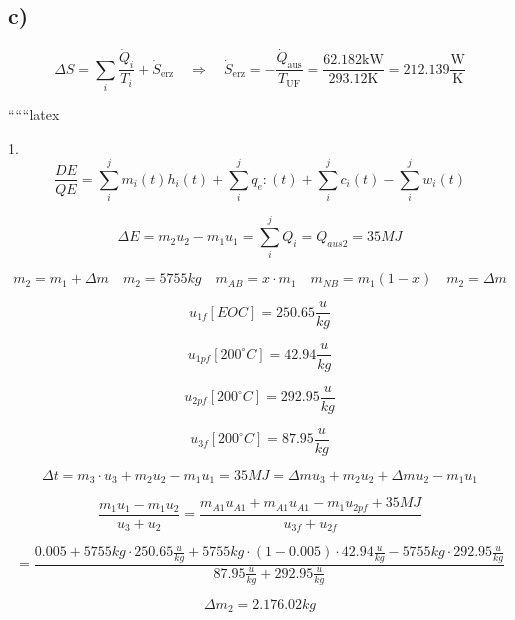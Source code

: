 

\subsection*{c)}

\begin{equation*}
\Delta S = \sum_{i} \frac{\dot{Q}_i}{T_i} + \dot{S}_{\text{erz}} \quad \Rightarrow \quad \dot{S}_{\text{erz}} = - \frac{\dot{Q}_{\text{aus}}}{T_{\text{UF}}} = \frac{62.182 \text{kW}}{293.12 \text{K}} = 212.139 \frac{\text{W}}{\text{K}}
\end{equation*}

``````latex

1. 
\[
\frac{DE}{QE} = \sum_i^j m_i(t) h_i(t) + \sum_i^j q_e:(t) + \sum_i^j c_i(t) - \sum_i^j w_i(t)
\]

\[
\Delta E = m_2 u_2 - m_1 u_1 = \sum_i^j Q_i = Q_{aus2} = 35MJ
\]

\[
m_2 = m_1 + \Delta m \quad m_2 = 5755kg \quad m_{AB} = x \cdot m_1 \quad m_{NB} = m_1 (1 - x) \quad m_2 = \Delta m
\]

\[
u_{1f} [EOC] = 250.65 \frac{u}{kg}
\]

\[
u_{1pf} [200^\circ C] = 42.94 \frac{u}{kg}
\]

\[
u_{2pf} [200^\circ C] = 292.95 \frac{u}{kg}
\]

\[
u_{3f} [200^\circ C] = 87.95 \frac{u}{kg}
\]

\[
\Delta t = m_3 \cdot u_3 + m_2 u_2 - m_1 u_1 = 35MJ = \Delta m u_3 + m_2 u_2 + \Delta m u_2 - m_1 u_1
\]

\[
\frac{m_1 u_1 - m_1 u_2}{u_3 + u_2} = \frac{m_{A1} u_{A1} + m_{A1} u_{A1} - m_1 u_{2pf} + 35MJ}{u_{3f} + u_{2f}}
\]

\[
= \frac{0.005 + 5755kg \cdot 250.65 \frac{u}{kg} + 5755kg \cdot (1 - 0.005) \cdot 42.94 \frac{u}{kg} - 5755kg \cdot 292.95 \frac{u}{kg}}{87.95 \frac{u}{kg} + 292.95 \frac{u}{kg}}
\]

\[
\Delta m_2 = 2.176.02kg
\]